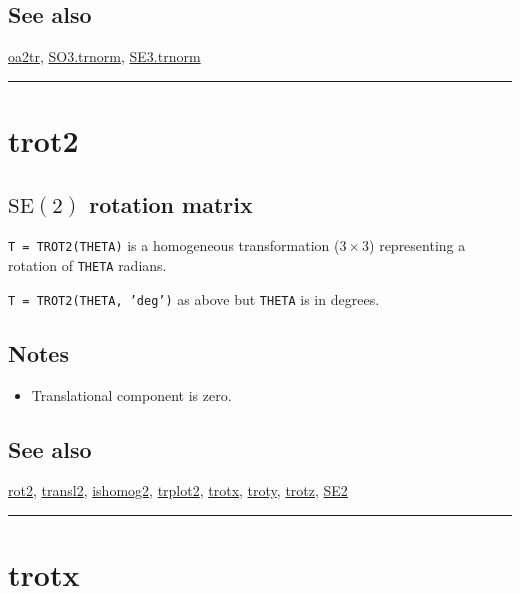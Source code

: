 \subsection*{See also}


\hyperlink{oa2tr}{\color{blue} oa2tr}, \hyperlink{SO3.trnorm}{\color{blue} SO3.trnorm}, \hyperlink{SE3.trnorm}{\color{blue} SE3.trnorm}

\vspace{1.5ex}\rule{\textwidth}{1mm}

\hypertarget{trot2}{\section*{trot2}}
\subsection*{$\mbox{SE}(2)$ rotation matrix}


\texttt{T = TROT2(THETA)} is a homogeneous transformation ($3 \times 3$) representing a rotation
of \texttt{THETA} radians.



\texttt{T = TROT2(THETA, 'deg')} as above but \texttt{THETA} is in degrees.


\subsection*{Notes}
\begin{itemize}
  \item Translational component is zero.
\end{itemize}

\subsection*{See also}


\hyperlink{rot2}{\color{blue} rot2}, \hyperlink{transl2}{\color{blue} transl2}, \hyperlink{ishomog2}{\color{blue} ishomog2}, \hyperlink{trplot2}{\color{blue} trplot2}, \hyperlink{trotx}{\color{blue} trotx}, \hyperlink{troty}{\color{blue} troty}, \hyperlink{trotz}{\color{blue} trotz}, \hyperlink{SE2}{\color{blue} SE2}

\vspace{1.5ex}\rule{\textwidth}{1mm}

\hypertarget{trotx}{\section*{trotx}}
